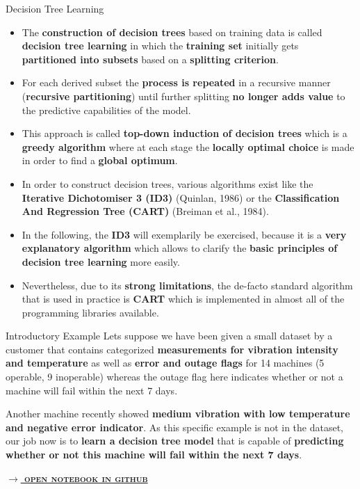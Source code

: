 \documentclass[document.tex]{subfiles}
\begin{document}
    \begin{frame}{Decision Tree Learning}
        \begin{itemize}
            \item The \textbf{construction of decision trees} based on training data is called \textbf{decision tree learning} in which the \textbf{training set} initially gets \textbf{partitioned into subsets} based on a \textbf{splitting criterion}. 
            \item For each derived subset the \textbf{process is repeated} in a recursive manner (\textbf{recursive partitioning}) until further splitting \textbf{no longer adds value} to the predictive capabilities of the model.
            \item This approach is called \textbf{top-down induction of decision trees} which is a \textbf{greedy algorithm} where at each stage the \textbf{locally optimal choice} is made in order to find a \textbf{global optimum}. 
            \item In order to construct decision trees, various algorithms exist like the \textbf{Iterative Dichotomiser 3 (ID3)} (Quinlan, 1986) or the \textbf{Classification And Regression Tree (CART)} (Breiman et al., 1984).
            \item In the following, the \textbf{ID3} will exemplarily be exercised, because it is a \textbf{very explanatory algorithm} which allows to clarify the \textbf{basic principles of decision tree learning} more easily. 
            \item Nevertheless, due to its \textbf{strong limitations}, the de-facto standard algorithm that is used in practice is \textbf{CART} which is implemented in almost all of the programming libraries available.
        \end{itemize}
    \end{frame}

    \begin{frame}{Introductory Example}
        Lets suppose we have been given a small dataset by a customer that contains categorized \textbf{measurements for vibration intensity and temperature} as well as \textbf{error and outage flags} for 14 machines (5 operable, 9 inoperable) whereas the outage flag here indicates whether or not a machine will fail within the next 7 days.

        \begin{table}
            \scalebox{0.8}{}
        \end{table}
        
        Another machine recently showed \textbf{medium vibration with low temperature and negative error indicator}. As this specific example is not in the dataset, our job now is to \textbf{learn a decision tree model} that is capable of \textbf{predicting whether or not this machine will fail within the next 7 days}.
        
        \small{\href{https://github.com/saschaschworm/big-data-and-data-science/blob/master/notebooks/demos/outage-decision-tree-learning.ipynb}{\textsc{\textbf{$\rightarrow$ open notebook in github}}}}
    \end{frame}
\end{document}
